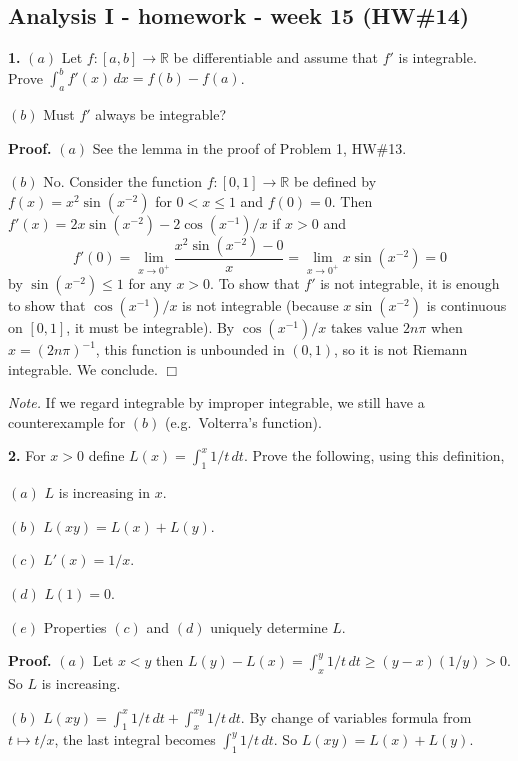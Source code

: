 \documentclass{article}
\begin{document}
    
    
    
    
    

    
    \subsection*{Analysis I - homework - week 15
(HW\#14)}\label{analysis-i---homework---week-15-hw14}

    \textbf{1.} $(a)$ Let $f : [a, b] \to \mathbb{R}$ be differentiable and
assume that $f'$ is integrable. Prove
$\int_a^b f'(x)\,dx = f (b) − f(a)$.

$(b)$ Must $f'$ always be integrable?

    \textbf{Proof.} $(a)$ See the lemma in the proof of Problem 1, HW\#13.

$(b)$ No. Consider the function $f:[0,1]\to \mathbb{R}$ be defined by
$f(x) = x^2 \sin(x^{-2}) $ for $0 < x \le 1$ and $f(0) = 0$. Then
$f'(x) = 2x\sin(x^{-2}) -2\cos (x^{-1})/x$ if $x>0$ and
\[f'(0) = \lim_{x\to 0^+}\frac{ x^2\sin(x^{-2}) - 0}{x} =  \lim_{x\to 0^+} x\sin (x^{-2}) = 0\]
by $\sin (x^{-2}) \le 1$ for any $x > 0$. To show that $f'$ is not
integrable, it is enough to show that $\cos (x^{-1})/x$ is not
integrable (because $x\sin(x^{-2})$ is continuous on $[0,1]$, it must be
integrable). By $\cos (x^{-1})/x$ takes value $2n\pi$ when
$x = (2n\pi)^{-1}$, this function is unbounded in $(0,1)$, so it is not
Riemann integrable. We conclude. $\Box$

\emph{Note.} If we regard integrable by improper integrable, we still
have a counterexample for $(b)$ (e.g.~Volterra's function).

    \textbf{2.} For $x > 0$ define $L(x) = \int_1^x 1/t \,dt$. Prove the
following, using this definition,

$(a)$ $L$ is increasing in $x$.

$(b)$ $L(xy) = L(x) + L(y)$.

$(c)$ $L'(x) = 1/x$.

$(d)$ $L(1) = 0$.

$(e)$ Properties $(c)$ and $(d)$ uniquely determine $L$.

    \textbf{Proof.} $(a)$ Let $x<y$ then
$L(y) - L(x) = \int_x^y 1/t \,dt\ge (y-x)(1/y)> 0$. So $L$ is
increasing.

$(b)$ $L(xy) = \int_1^x 1/t \,dt + \int_x^{xy}1/t \,dt$. By change of
variables formula from $t\mapsto t/x$, the last integral becomes
$\int_1^y1/t \,dt$. So $L(xy) = L(x) + L(y)$.
\end{document}
